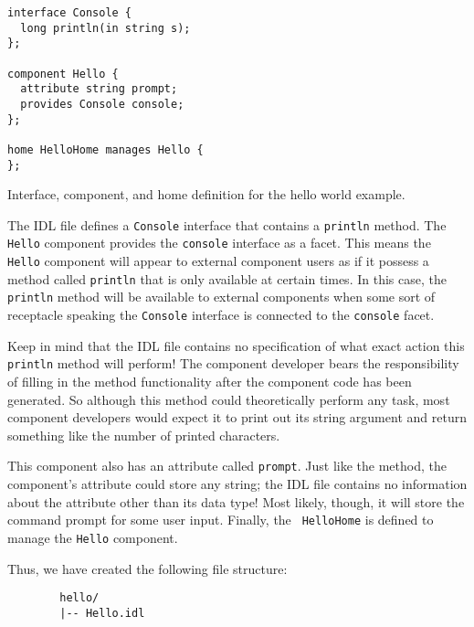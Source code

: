 \begin{Example}
\begin{minifbox}
\begin{small}
\begin{verbatim}
interface Console {
  long println(in string s);
};

component Hello {
  attribute string prompt;
  provides Console console;
};

home HelloHome manages Hello {
};
\end{verbatim}
\end{small}
\end{minifbox}
\caption{Interface, component, and home definition for the hello world example.}
\label{example:one-component-idl}
\end{Example}

The IDL file defines a {\tt Console} interface that contains a {\tt println}
method. The {\tt Hello} component provides the {\tt console} interface as a
facet. This means the {\tt Hello} component will appear to external component
users as if it possess a method called {\tt println} that is only available at
certain times. In this case, the {\tt println} method will be available to
external components when some sort of receptacle speaking the {\tt Console}
interface is connected to the {\tt console} facet.

Keep in mind that the IDL file contains no specification of what exact action
this {\tt println} method will perform! The component developer bears the
responsibility of filling in the method functionality after the component code
has been generated. So although this method could theoretically perform any
task, most component developers would expect it to print out its string argument
and return something like the number of printed characters.

This component also has an attribute called {\tt prompt}. Just like the method,
the component's attribute could store any string; the IDL file contains no
information about the attribute other than its data type! Most likely, though,
it will store the command prompt for some user input. Finally, the {\tt
HelloHome} is defined to manage the {\tt Hello} component.

Thus, we have created the following file structure:
\begin{small}
\begin{verbatim}
        hello/
        |-- Hello.idl
\end{verbatim}
\end{small}

